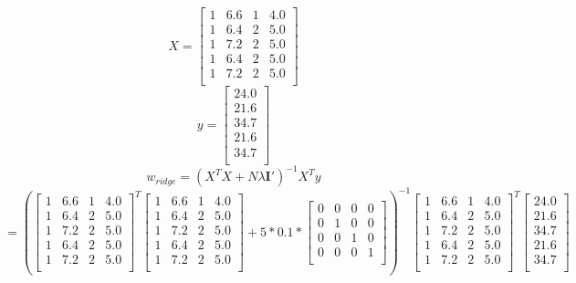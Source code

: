 \documentclass[12pt]{article}
\begin{document}
\section{}
\[ X = \begin{bmatrix}
	1 & 6.6 & 1 & 4.0 \\
	1 & 6.4 & 2 & 5.0 \\
	1 & 7.2 & 2 & 5.0 \\
	1 & 6.4 & 2 & 5.0 \\
	1 & 7.2 & 2 & 5.0 \\
\end{bmatrix} \]
\[ y = \begin{bmatrix}
	24.0 \\
	21.6 \\
	34.7 \\
	21.6 \\
	34.7 \\
\end{bmatrix} \]
\[ w_{ridge} = \left(X^TX+N\lambda \textbf{I}'\right)^{-1}X^Ty \]
\[
	= \left(
	\begin{bmatrix}
		1 & 6.6 & 1 & 4.0 \\
		1 & 6.4 & 2 & 5.0 \\
		1 & 7.2 & 2 & 5.0 \\
		1 & 6.4 & 2 & 5.0 \\
		1 & 7.2 & 2 & 5.0 \\
	\end{bmatrix}^T
	\begin{bmatrix}
		1 & 6.6 & 1 & 4.0 \\
		1 & 6.4 & 2 & 5.0 \\
		1 & 7.2 & 2 & 5.0 \\
		1 & 6.4 & 2 & 5.0 \\
		1 & 7.2 & 2 & 5.0 \\
	\end{bmatrix}+5 * 0.1 * 
\begin{bmatrix}
	0 & 0 & 0 & 0 \\
	0 & 1 & 0 & 0 \\
	0 & 0 & 1 & 0 \\
	0 & 0 & 0 & 1 \\
\end{bmatrix}\right)^{-1}
\begin{bmatrix}
	1 & 6.6 & 1 & 4.0 \\
	1 & 6.4 & 2 & 5.0 \\
	1 & 7.2 & 2 & 5.0 \\
	1 & 6.4 & 2 & 5.0 \\
	1 & 7.2 & 2 & 5.0 \\
\end{bmatrix}^T
\begin{bmatrix}
	24.0 \\
	21.6 \\
	34.7 \\
	21.6 \\
	34.7 \\
\end{bmatrix}
\]
\end{document}
